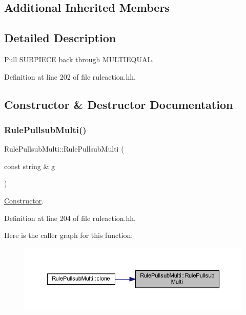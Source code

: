 \subsection*{Additional Inherited Members}


\subsection{Detailed Description}
Pull S\+U\+B\+P\+I\+E\+CE back through M\+U\+L\+T\+I\+E\+Q\+U\+AL. 

Definition at line 202 of file ruleaction.\+hh.



\subsection{Constructor \& Destructor Documentation}
\mbox{\label{class_rule_pullsub_multi_add0825c4eecde38ebf6fd264ead8510b}} 
\subsubsection{\texorpdfstring{RulePullsubMulti()}{RulePullsubMulti()}}
{\footnotesize\ttfamily Rule\+Pullsub\+Multi\+::\+Rule\+Pullsub\+Multi (\begin{DoxyParamCaption}\item[{const string \&}]{g }\end{DoxyParamCaption})\hspace{0.3cm}{\ttfamily [inline]}}



\mbox{\hyperlink{class_constructor}{Constructor}}. 



Definition at line 204 of file ruleaction.\+hh.

Here is the caller graph for this function\+:
\nopagebreak
\begin{figure}[H]
\begin{center}
\leavevmode
\includegraphics[width=350pt]{class_rule_pullsub_multi_add0825c4eecde38ebf6fd264ead8510b_icgraph}
\end{center}
\end{figure}


